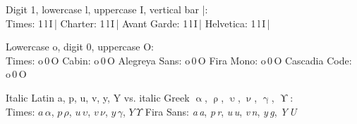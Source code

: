 \begin{longtblr}{}
	Digit 1, lowercase l, uppercase I, vertical bar |: \\
	\small%
	{\selectfont Times: 1\,l\,I\,|} \quad
	{\selectfont Charter: 1\,l\,I\,|} \quad
	{\selectfont Avant Garde: 1\,l\,I\,|} \quad
	{\selectfont Helvetica: 1\,l\,I\,|} 
	\par
	\normalsize%
	Lowercase o, digit 0, uppercase O: \\
	\small%
	{\selectfont Times: o\,0\,O}\quad
	{\selectfont Cabin: o\,0\,O}\quad
	{\selectfont Alegreya Sans: o\,0\,O}\quad
	{\selectfont Fira Mono: o\,0\,O}\quad
	{\selectfont Cascadia Code: o\,0\,O}
	\par
	\normalsize%
	Italic Latin a, p, u, v, y, Y vs. italic Greek $\upalpha$, $\uprho$, $\upupsilon$, $\upnu$, $\upgamma$, $\upUpsilon$: \\
	\small%
	Times: $a \, \alpha$, $p \, \rho$, $u \, \upsilon$, $v \, \nu$, $y \, \gamma$, $Y \, \mathit{\Upsilon}$
	\quad
	{\selectfont Fira Sans: {\itshape a\,{\selectfont a}}, {\itshape p\,{\selectfont r}}, {\itshape u\,{\selectfont u}}, {\itshape v\,{\selectfont n}}, {\itshape y\,{\selectfont g}}, {\itshape Y\,{\selectfont U}}}
\end{longtblr}

